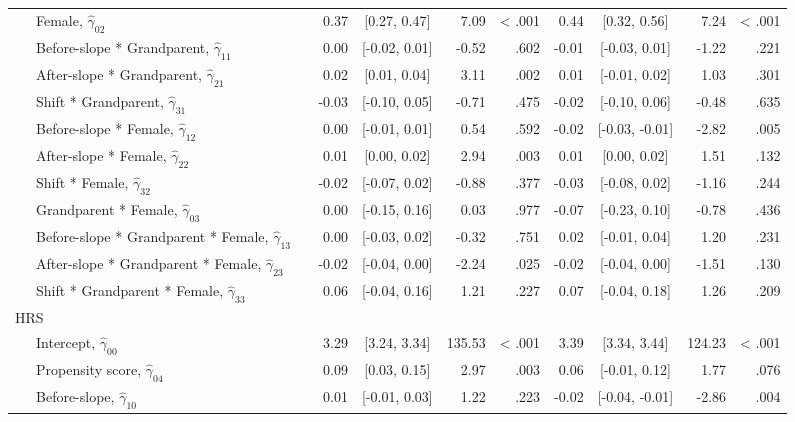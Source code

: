 \documentclass[
  english,
  man,floatsintext]{apa7}
\newenvironment{lltable}{\begin{landscape}\begin{center}\begin{ThreePartTable}}{\end{ThreePartTable}\end{center}\end{landscape}}
\begin{document}
\begin{lltable}
{\begin{longtable}{lrcrrrcrr}
\ \ \ Female, $\hat{\gamma}_{02}$ \textcolor{white}{L} & 0.37 & {}[0.27, 0.47] & 7.09 & < .001 & 0.44 & {}[0.32, 0.56] & 7.24 & < .001\\
\ \ \ Before-slope * Grandparent, $\hat{\gamma}_{11}$ \textcolor{white}{L} & 0.00 & {}[-0.02, 0.01] & -0.52 & .602 & -0.01 & {}[-0.03, 0.01] & -1.22 & .221\\
\ \ \ After-slope * Grandparent, $\hat{\gamma}_{21}$ \textcolor{white}{L} & 0.02 & {}[0.01, 0.04] & 3.11 & .002 & 0.01 & {}[-0.01, 0.02] & 1.03 & .301\\
\ \ \ Shift * Grandparent, $\hat{\gamma}_{31}$ \textcolor{white}{L} & -0.03 & {}[-0.10, 0.05] & -0.71 & .475 & -0.02 & {}[-0.10, 0.06] & -0.48 & .635\\
\ \ \ Before-slope * Female, $\hat{\gamma}_{12}$ \textcolor{white}{L} & 0.00 & {}[-0.01, 0.01] & 0.54 & .592 & -0.02 & {}[-0.03, -0.01] & -2.82 & .005\\
\ \ \ After-slope * Female, $\hat{\gamma}_{22}$ \textcolor{white}{L} & 0.01 & {}[0.00, 0.02] & 2.94 & .003 & 0.01 & {}[0.00, 0.02] & 1.51 & .132\\
\ \ \ Shift * Female, $\hat{\gamma}_{32}$ \textcolor{white}{L} & -0.02 & {}[-0.07, 0.02] & -0.88 & .377 & -0.03 & {}[-0.08, 0.02] & -1.16 & .244\\
\ \ \ Grandparent * Female, $\hat{\gamma}_{03}$ \textcolor{white}{L} & 0.00 & {}[-0.15, 0.16] & 0.03 & .977 & -0.07 & {}[-0.23, 0.10] & -0.78 & .436\\
\ \ \ Before-slope * Grandparent * Female, $\hat{\gamma}_{13}$ \textcolor{white}{L} & 0.00 & {}[-0.03, 0.02] & -0.32 & .751 & 0.02 & {}[-0.01, 0.04] & 1.20 & .231\\
\ \ \ After-slope * Grandparent * Female, $\hat{\gamma}_{23}$ \textcolor{white}{L} & -0.02 & {}[-0.04, 0.00] & -2.24 & .025 & -0.02 & {}[-0.04, 0.00] & -1.51 & .130\\
\ \ \ Shift * Grandparent * Female, $\hat{\gamma}_{33}$ \textcolor{white}{L} & 0.06 & {}[-0.04, 0.16] & 1.21 & .227 & 0.07 & {}[-0.04, 0.18] & 1.26 & .209\\
HRS &  &  &  &  &  &  &  & \\
\ \ \ Intercept, $\hat{\gamma}_{00}$ \textcolor{white}{H} & 3.29 & {}[3.24, 3.34] & 135.53 & < .001 & 3.39 & {}[3.34, 3.44] & 124.23 & < .001\\
\ \ \ Propensity score, $\hat{\gamma}_{04}$ \textcolor{white}{H} & 0.09 & {}[0.03, 0.15] & 2.97 & .003 & 0.06 & {}[-0.01, 0.12] & 1.77 & .076\\
\ \ \ Before-slope, $\hat{\gamma}_{10}$ \textcolor{white}{H} & 0.01 & {}[-0.01, 0.03] & 1.22 & .223 & -0.02 & {}[-0.04, -0.01] & -2.86 & .004\\

\end{longtable}}
\end{lltable}
\end{document}
